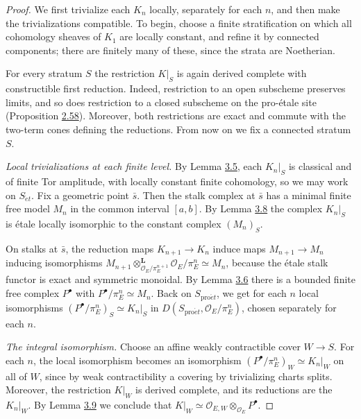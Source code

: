 \documentclass[11pt]{article}
\begin{document}
\begin{proof}[{Proof}]\label{bp224}%
We first trivialize each \(K_n\) locally, separately for each \(n\), and then make the trivializations compatible. To begin, choose a finite stratification on which all cohomology sheaves of \(K_1\) are locally constant, and refine it by connected components; there are finitely many of these, since the strata are Noetherian.

For every stratum \(S\) the restriction \(K|_S\) is again derived complete with constructible first reduction. Indeed, restriction to an open subscheme preserves limits, and so does restriction to a closed subscheme on the pro-étale site (Proposition \hyperref[bp181]{2.58}). Moreover, both restrictions are exact and commute with the two-term cones defining the reductions. From now on we fix a connected stratum \(S\).

\emph{Local trivializations at each finite level.} By Lemma \hyperref[bp208]{3.5}, each \(K_n|_S\) is classical and of finite Tor amplitude, with locally constant finite cohomology, so we may work on \(S_{\acute{e}t}\). Fix a geometric point \(\bar s\). Then the stalk complex at \(\bar s\) has a minimal finite free model \(M_n\) in the common interval \([a,b]\). By Lemma \hyperref[bp218]{3.8} the complex \(K_n|_S\) is étale locally isomorphic to the constant complex \((M_n)_S\).

On stalks at \(\bar s\), the reduction maps \(K_{n+1}\to K_n\) induce maps \(M_{n+1}\to M_n\) inducing isomorphisms \(M_{n+1}\otimes^{\mathbf L}_{\mathcal O_E/\pi_E^{n+1}}\mathcal O_E/\pi_E^n\simeq M_n\), because the étale stalk functor is exact and symmetric monoidal. By Lemma \hyperref[bp211]{3.6} there is a bounded finite free complex \(P^\bullet\) with \(P^\bullet/\pi_E^n\simeq M_n\). Back on \(S_{\mathrm{pro}\acute{e}t}\), we get for each \(n\) local isomorphisms \((P^\bullet/\pi_E^n)_S\simeq K_n|_S\) in \(D(S_{\mathrm{pro}\acute{e}t},\mathcal O_E/\pi_E^n)\), chosen separately for each \(n\).

\emph{The integral isomorphism.} Choose an affine weakly contractible cover \(W\to S\). For each \(n\), the local isomorphism becomes an isomorphism \((P^\bullet/\pi_E^n)_W\simeq K_n|_W\) on all of \(W\), since by weak contractibility a covering by trivializing charts splits. Moreover, the restriction \(K|_W\) is derived complete, and its reductions are the \(K_n|_W\). By Lemma \hyperref[bp221]{3.9} we conclude that \(K|_W\simeq\mathcal O_{E,W}\otimes_{\mathcal O_E}P^\bullet\).
\end{proof}
\end{document}
